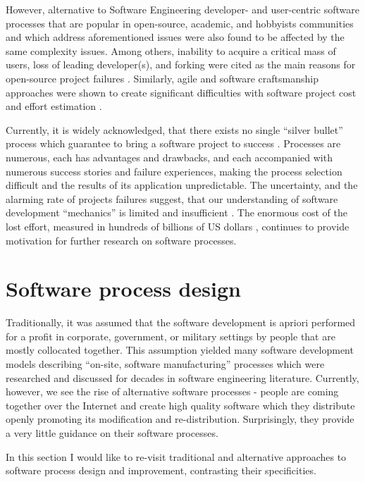 However, alternative to Software Engineering developer- and user-centric software processes that are 
popular in open-source, academic, and hobbyists communities and which address aforementioned issues 
were also found to be affected by the same complexity issues. 
Among others, inability to acquire a critical mass of users, loss of leading developer(s), and forking 
were cited as the main reasons for open-source project failures \cite{richter2007critique}. 
Similarly, agile and software craftsmanship approaches were shown to create significant difficulties with 
software project cost and effort estimation \cite{citeulike:12933080}.

Currently, it is widely acknowledged, that there exists no single ``silver bullet'' process which 
guarantee to bring a software project to success \cite{citeulike:1986013}. 
Processes are numerous, each has advantages and drawbacks, and each accompanied with 
numerous success stories and failure experiences, making the process selection difficult 
and the results of its application unpredictable.
The uncertainty, and the alarming rate of projects failures suggest, that our understanding 
of software development ``mechanics'' is limited and insufficient \cite{citeulike:12550665}. 
The enormous cost of the lost effort, measured in hundreds of billions of US dollars 
\cite{citeulike:2207657} \cite{citeulike:2207653} \cite{citeulike:2207655}, 
continues to provide motivation for further research on software processes. 

%
%
\section{Software process design}\label{section_software_process_design}
Traditionally, it was assumed that the software development is apriori performed for a profit 
in corporate, government, or military settings by people that are mostly collocated 
together. This assumption yielded many software development models describing 
``on-site, software manufacturing'' processes which were researched and discussed 
for decades in software  engineering literature. 
Currently, however, we see the rise of alternative software processes - people are coming 
together over the Internet and create high quality software which they distribute openly 
promoting its modification and re-distribution. Surprisingly, they provide a very little 
guidance on their software processes. 

In this section I would like to re-visit traditional and alternative approaches to software process
design and improvement, contrasting their specificities.

